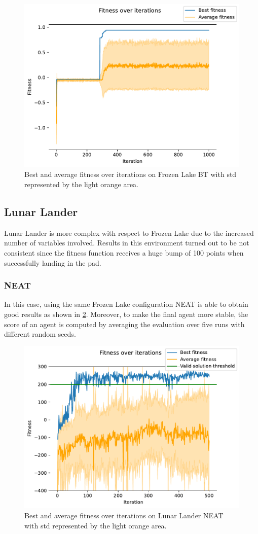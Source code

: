 \begin{figure}
    \centering
    \includegraphics[width=0.8\linewidth]{./images/fitness_over_iterations_frozenlake_bt.pdf}
    \caption{Best and average fitness over iterations on Frozen Lake BT with std represented by the light orange area.}
    \label{fig:fitness-bt-frozen-lake}
\end{figure}

\subsection{Lunar Lander}
Lunar Lander is more complex with respect to Frozen Lake due to the increased number of variables involved. Results in this environment turned out to be not consistent since the fitness function receives a huge bump of 100 points when successfully landing in the pad.

\subsubsection{NEAT}
In this case, using the same Frozen Lake configuration NEAT is able to obtain good results as shown in \cref{fig:fitness-neat-lunar-lander}. Moreover, to make the final agent more stable, the score of an agent is computed by averaging the evaluation over five runs with different random seeds.

\begin{figure}
    \centering
    \includegraphics[width=0.8\linewidth]{./images/fitness_over_iterations_lunar_lander_neat.pdf}
    \caption{Best and average fitness over iterations on Lunar Lander NEAT with std represented by the light orange area.}
    \label{fig:fitness-neat-lunar-lander}
\end{figure}

